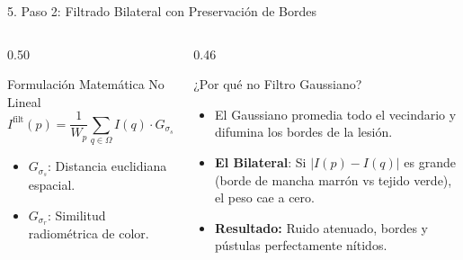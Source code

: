 \documentclass[aspectratio=169,10pt]{beamer}
\begin{document}
\begin{frame}{5. Paso 2: Filtrado Bilateral con Preservación de Bordes}
    \begin{columns}[T]
        \begin{column}{0.50\textwidth}
            \begin{block}{Formulación Matemática No Lineal}
                $$I^{\text{filt}}(p) = \frac{1}{W_p}\sum_{q \in \Omega} I(q) \cdot G_{\sigma_s}(\|p-q\|) \cdot G_{\sigma_r}(|I(p)-I(q)|)$$
                \begin{itemize}
                    \item $G_{\sigma_s}$: Distancia euclidiana espacial.
                    \item $G_{\sigma_r}$: Similitud radiométrica de color.
                \end{itemize}
            \end{block}
        \end{column}
        
        \begin{column}{0.46\textwidth}
            \begin{exampleblock}{¿Por qué no Filtro Gaussiano?}
                \begin{itemize}
                    \item El Gaussiano promedia todo el vecindario y difumina los bordes de la lesión.
                    \item \textbf{El Bilateral}: Si $|I(p)-I(q)|$ es grande (borde de mancha marrón vs tejido verde), el peso cae a cero.
                    \item \textbf{Resultado:} Ruido atenuado, bordes y pústulas perfectamente nítidos.
                \end{itemize}
            \end{exampleblock}
        \end{column}
    \end{columns}
\end{frame}
\end{document}

